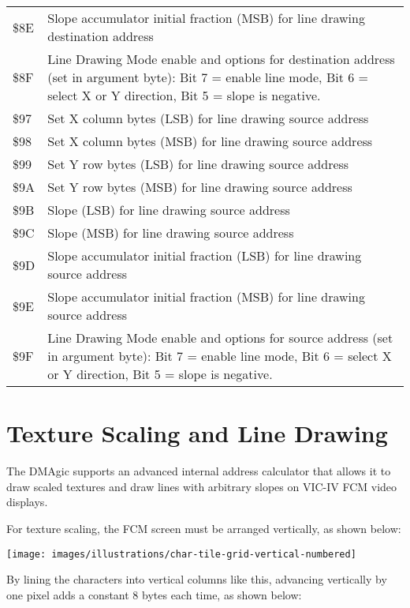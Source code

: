 \begin{center}
\begin{tabular}{|>{\centering\arraybackslash}p{1.5cm}|p{10cm}|}
  \$8E & Slope accumulator initial fraction (MSB) for line drawing destination address \\
  \$8F & Line Drawing Mode enable and options for destination address (set in argument byte): Bit 7 = enable line mode, Bit 6 = select X or Y direction, Bit 5 = slope is negative. \\
  \$97 & Set X column bytes (LSB) for line drawing source address \\
  \$98 & Set X column bytes (MSB) for line drawing source address \\
  \$99 & Set Y row bytes (LSB) for line drawing source address \\
  \$9A & Set Y row bytes (MSB) for line drawing source address \\
  \$9B & Slope (LSB) for line drawing source address \\
  \$9C & Slope (MSB) for line drawing source address \\
  \$9D & Slope accumulator initial fraction (LSB) for line drawing source address \\
  \$9E & Slope accumulator initial fraction (MSB) for line drawing source address \\
  \$9F & Line Drawing Mode enable and options for source address (set in argument byte): Bit 7 = enable line mode, Bit 6 = select X or Y direction, Bit 5 = slope is negative. \\
  
  \hline
\end{tabular}
\end{center}

\section{Texture Scaling and Line Drawing}

The DMAgic supports an advanced internal address calculator that allows it to draw scaled textures and draw
lines with arbitrary slopes on VIC-IV FCM video displays.

For texture scaling, the FCM screen must be arranged
vertically, as shown below:

\begin{center}
\texttt{[image: images/illustrations/char-tile-grid-vertical-numbered]}
\end{center}

By lining the characters into vertical columns like this, advancing vertically by one pixel adds a constant 8 bytes each time, as shown below:

